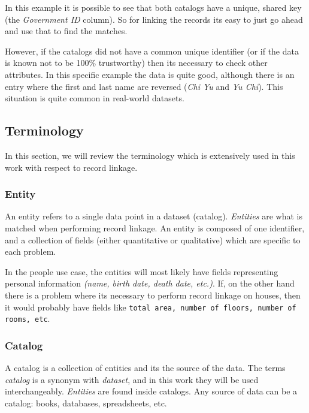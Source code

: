 \documentclass[epsfig,a4paper,11pt,titlepage,twoside,openany]{book}
\begin{document}
In this example it is possible to see that both catalogs have a unique, shared key (the
\textit{Government ID} column). So for linking the records its easy to just go ahead
and use that to find the matches.

However, if the catalogs did not have a common unique identifier (or if the
data is known not to be 100\% trustworthy) then its necessary to check other attributes. In
this specific example the data is quite good, although there is an entry where
the first and last name are reversed (\textit{Chi Yu} and \textit{Yu Chi}). This
situation is quite common in real-world datasets.

\subsection{Terminology}
\label{sec:rl-terminology}

In this section, we will review the terminology which is extensively used in this work with respect to record linkage.

\subsubsection{Entity}
\label{sec:rl-term-entity}

An entity refers to a single data point in a dataset (catalog). \textit{Entities} are what is matched when performing record linkage. An entity is composed of one identifier, and a collection of fields (either quantitative or qualitative) which are specific to each problem. 
  
In the people use case, the entities will most likely have fields representing personal information \textit{(name, birth date, death date, etc.)}. If, on the other hand there is a problem where its necessary to perform record linkage on houses, then it would probably have fields like \texttt{total area, number of floors, number of rooms, etc}.


\subsubsection{Catalog}
\label{sec:rl-term-catalog}

A catalog is a collection of entities and its the source of the data. The terms \textit{catalog} is a synonym with \textit{dataset}, and in this work they will be used interchangeably. \textit{Entities} are found inside catalogs. 
Any source of data can be a catalog: books, databases, spreadsheets, etc.
\end{document}
